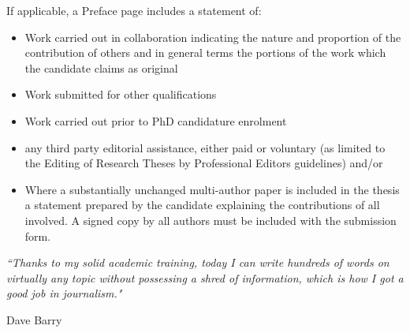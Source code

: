 \documentclass[11pt, oneside]{Thesis} %
\begin{document}
If applicable, a Preface page includes a statement of:
\begin{itemize}
	\item Work carried out in collaboration indicating the nature and proportion of the contribution of others and in general terms the portions of the work which the candidate claims as original
	\item Work submitted for other qualifications
	\item Work carried out prior to PhD candidature enrolment
	\item any third party editorial assistance, either paid or voluntary (as limited to the Editing of Research Theses by Professional Editors guidelines) and/or
	\item Where a substantially unchanged multi-author paper is included in the thesis a statement prepared by the candidate explaining the contributions of all involved. A signed copy by all authors must be included with the submission form.
\end{itemize}
\clearpage


\pagestyle{empty} %

\null\vfill

\textit{``Thanks to my solid academic training, today I can write hundreds of words on virtually any topic without possessing a shred of information, which is how I got a good job in journalism."}

\begin{flushright}
Dave Barry
\end{flushright}

\vfill\vfill\vfill\vfill\vfill\vfill\null 

\clearpage



\clearpage
\end{document}
